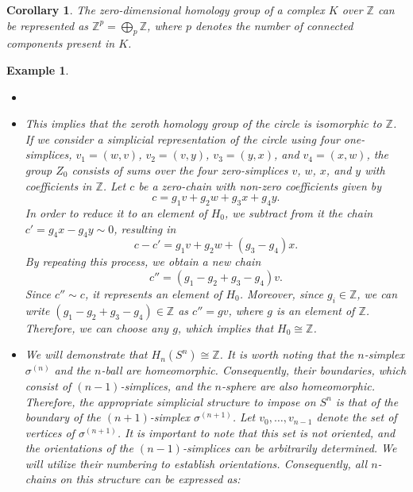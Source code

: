 \documentclass{article}
\newtheorem{corollary}[definition]{Corollary}
\newtheorem{example}[definition]{Example}
\begin{document}
\begin{corollary}
The zero-dimensional homology group of a complex $K$ over $\mathbb{Z}$ can be represented as $\mathbb{Z}^p = \bigoplus_p \mathbb{Z}$, where $p$ denotes the number of connected components present in $K$.
\end{corollary}

\begin{example}
\begin{itemize}
	\item[]
	\item This implies that the zeroth homology group of the circle is isomorphic to $\mathbb{Z}$. If we consider a simplicial representation of the circle using four one-simplices, $v_1 = (w,v)$, $v_2 = (v,y)$, $v_3 = (y,x)$, and $v_4 = (x,w)$, the group $Z_0$ consists of sums over the four zero-simplices $v$, $w$, $x$, and $y$ with coefficients in $\mathbb{Z}$. Let $c$ be a zero-chain with non-zero coefficients given by
	\begin{equation}
	c = g_1v+g_2w+g_3x+g_4y.
	\end{equation}
	In order to reduce it to an element of $H_0$, we subtract from it the chain $c' = g_4x-g_4y \sim 0$, resulting in
	\begin{equation}
	c-c' = g_1v+g_2w +(g_3-g_4)x.
	\end{equation}
	By repeating this process, we obtain a new chain
	\begin{equation}
	c'' = (g_1-g_2+g_3-g_4)v.
	\end{equation}
	Since $c'' \sim c$, it represents an element of $H_0$. Moreover, since $g_i \in \mathbb{Z}$, we can write $(g_1-g_2+g_3-g_4) \in \mathbb{Z}$ as $c'' = gv$, where $g$ is an element of $\mathbb{Z}$. Therefore, we can choose any $g$, which implies that $H_0 \cong \mathbb{Z}$.
	\item We will demonstrate that $H_n(S^n) \cong \mathbb{Z}$. It is worth noting that the $n$-simplex $\sigma^{(n)}$ and the $n$-ball are homeomorphic. Consequently, their boundaries, which consist of $(n-1)$-simplices, and the $n$-sphere are also homeomorphic. Therefore, the appropriate simplicial structure to impose on $S^n$ is that of the boundary of the $(n+1)$-simplex $\sigma^{(n+1)}$. Let ${v_0,\ldots,v_{n-1}}$ denote the set of vertices of $\sigma^{(n+1)}$. It is important to note that this set is not oriented, and the orientations of the $(n-1)$-simplices can be arbitrarily determined. We will utilize their numbering to establish orientations. Consequently, all $n$-chains on this structure can be expressed as:

\end{itemize}
\end{example}
\end{document}
